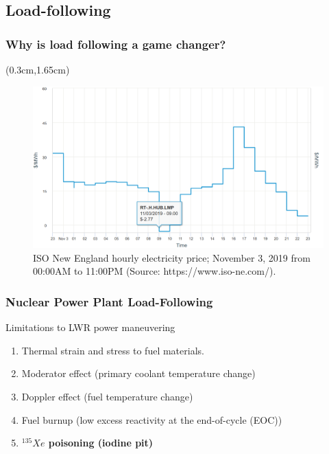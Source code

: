 \subsection{Load-following}
\begin{frame}
\frametitle{Why is load following a game changer?}
	\begin{textblock*}{12.1cm}(0.3cm,1.65cm) %
\begin{figure}[t]
	\includegraphics[width=\textwidth]{./images/ne_one_day_price.png}
		\vspace{-6mm}
	\caption{ISO New England hourly electricity price; November 3, 2019 
	from 00:00AM to 11:00PM (Source: https://www.iso-ne.com/).}
\end{figure}  
\end{textblock*}
\end{frame}

\begin{frame}
\frametitle{Nuclear Power Plant Load-Following}
        \begin{block}{Limitations to \gls{LWR} power maneuvering \cite{lokhov_technical_2011}}
	\begin{enumerate}
		\item<1-> Thermal strain and stress to fuel materials.
		\item<1-> Moderator effect (primary coolant temperature change)
		\item<1-> Doppler effect (fuel temperature change)
		\item<1-> Fuel burnup (low excess reactivity at the end-of-cycle 
		(EOC))
        \item<3-> \textbf{$^{135}Xe$ poisoning (iodine pit)}
	\end{enumerate}
\end{block}
\end{frame}


